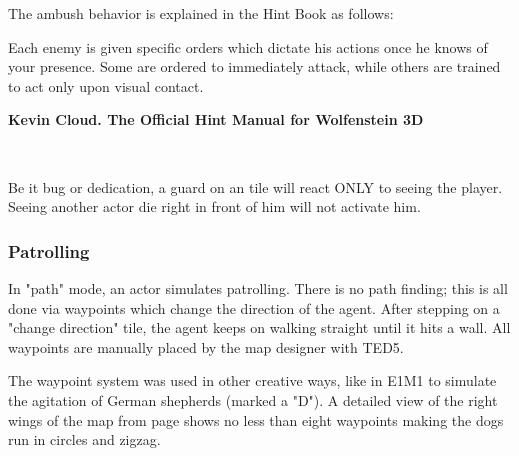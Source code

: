 \pagebreak
{} The ambush behavior is explained in the Hint Book as follows:\\
\par
\begin{fancyquotes}
Each enemy is given specific orders which dictate his actions once he knows of your presence. Some are ordered to immediately attack, while others are trained to act only upon visual contact.\\
\par
\textbf{Kevin Cloud. The Official Hint Manual for Wolfenstein 3D}
 \end{fancyquotes}\\
\par
Be it bug or dedication, a guard on an  tile will react ONLY to seeing the player. Seeing another actor die right in front of him will not activate him.\\


\subsubsection{Patrolling}
In "path" mode, an actor simulates patrolling. There is no path finding; this is all done via waypoints which change the direction of the agent. After stepping on a "change direction" tile, the agent keeps on walking straight until it hits a wall. All waypoints are manually placed by the map designer with TED5.\\ 
\par
The waypoint system was used in other creative ways, like in E1M1 to simulate the agitation of German shepherds (marked a "D"). A detailed view of the right wings of the map from page \pageref{mape1m1} shows no less than eight waypoints making the dogs run in circles and zigzag.\\
\par
\begin{figure}[H]
 \centering
\end{figure}
\par





